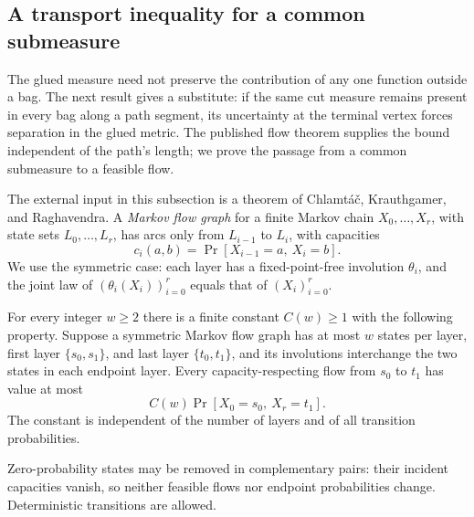 \subsection{A transport inequality for a common submeasure}

The glued measure need not preserve the contribution of any one
function outside a bag.  The next result gives a substitute: if the
same cut measure remains present in every bag along a path segment,
its uncertainty at the terminal vertex forces separation in the glued
metric.  The published flow theorem supplies the bound independent of
the path's length; we prove the passage from a common submeasure to a
feasible flow.

The external input in this subsection is a theorem of
Chlamt\'a\v{c}, Krauthgamer, and Raghavendra.
A \emph{Markov flow graph} for a finite Markov chain
$X_0,\ldots,X_r$, with state sets $L_0,\ldots,L_r$, has arcs only from
$L_{i-1}$ to $L_i$, with capacities
\[
 c_i(a,b)=\Pr[X_{i-1}=a,\ X_i=b].
\]
We use the symmetric case: each layer has a fixed-point-free involution
$\theta_i$, and the joint law of $(\theta_i(X_i))_{i=0}^r$ equals that
of $(X_i)_{i=0}^r$.

\begin{theorem}\label{thm:markov-flow}
For every integer $w\geq2$ there is a finite constant $C(w)\geq1$
with the following property.
Suppose a symmetric Markov flow graph has at most $w$ states per layer,
first layer $\{s_0,s_1\}$, and last layer $\{t_0,t_1\}$, and its
involutions interchange the two states in each endpoint layer.
Every capacity-respecting flow from $s_0$ to $t_1$ has value at most
\[
 C(w)\Pr[X_0=s_0,\ X_r=t_1].
\]
The constant is independent of the number of layers and of all
transition probabilities.
\end{theorem}

Zero-probability states may be removed in complementary pairs: their
incident capacities vanish, so neither feasible flows nor endpoint
probabilities change. Deterministic transitions are allowed.

